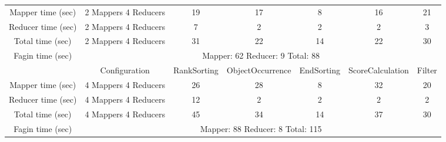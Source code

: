 \documentclass[a4paper]{article}
\begin{document}
\begin{table}[htbp]
{\begin{tabular}{|c|c|c|c|c|c|c|}
            \hline
            Mapper time (sec) & 2 Mappers 4 Reducers & 19 & 17 & 8 & 16 & 21  \\
            Reducer time (sec) & 2 Mappers 4 Reducers & 7 & 2 & 2 & 2 & 3  \\
            Total time (sec) & 2 Mappers 4 Reducers & 31 & 22 & 14 & 22 & 30 \\
            \hline
            Fagin time (sec) & \multicolumn{6}{|c|}{Mapper: 62 Reducer: 9 Total: 88}  \\
            \hline
            \hline
             & Configuration & RankSorting & ObjectOccurrence & EndSorting & ScoreCalculation & Filter  \\
            \hline
            Mapper time (sec) & 4 Mappers 4 Reducers & 26 & 28 & 8 & 32 & 20  \\
            Reducer time (sec) & 4 Mappers 4 Reducers & 12 & 2 & 2 & 2 & 2   \\
            Total time (sec) & 4 Mappers 4 Reducers & 45 & 34 & 14 & 37 & 30 \\
            \hline
            Fagin time (sec) & \multicolumn{6}{|c|}{Mapper: 88 Reducer: 8 Total: 115}  \\
            \hline
        \end{tabular}
    }
\end{table}
\end{document}
